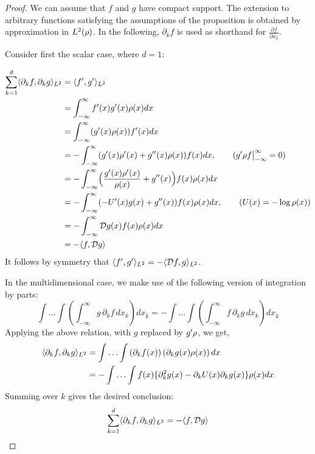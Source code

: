 \begin{proof}[Proof]
	We can assume that $f$ and $g$ have compact support. The extension to arbitrary functions satisfying the assumptions of the proposition is obtained by approximation in $L^2(\rho)$. In the following, $\partial_k f$ is used as shorthand for $\frac{\partial f}{\partial x_k}$. 
	
	Consider first the scalar case, where $d=1$: 

	\begin{equation}
	\begin{aligned}
	\sum_{k=1}^d \langle \partial_k f,  \partial_k g\rangle_{L^2}&= \langle f', g' \rangle_{L^2}\\
	&= \int_{-\infty}^{\infty} f'(x)g'(x)\rho(x)dx \\
	&= \int_{-\infty}^{\infty} (g'(x) \rho(x)) f'(x)dx \\
	&= -\int_{-\infty}^{\infty}(g'(x) \rho'(x) +g''(x) \rho(x)) f(x) dx, \qquad{ (g'\rho f \big|_{-\infty}^{\infty}=0) }\\
	&= -\int_{-\infty}^{\infty}\Bigl(\frac{g'(x) \rho'(x)}{\rho(x)}+g''(x)\Bigr) f(x) \rho(x) dx \\
	&= -\int_{-\infty}^{\infty}(-U'(x) g(x) + g''(x))  f(x) \rho(x) dx, \qquad ( U(x) = -\log \rho(x) )\\
	&= -\int_{-\infty}^{\infty} {\cal D} g (x) f(x) \rho(x) dx \\
	&= -\langle f, {\cal D} g \rangle
	\end{aligned}
	\end{equation}
	It follows by symmetry that $\langle f', g' \rangle_{L^2} = - \langle {\cal D} f, g \rangle_{L^2}$.  
	
	In the multidimensional case, we make use of the following version of integration by parts:
	\begin{equation}
	\int \hdots \int \left(\int_{-\infty}^{\infty} g \, \partial_k f \, dx_k\right) dx_{\bar{k}} = -\int \hdots \int \left(\int_{-\infty}^{\infty} f\, \partial_k g \, dx_k\right) dx_{\bar{k}}
	\end{equation}
	Applying the above relation, with $g$ replaced by $g'\rho$, we get, 
	\begin{equation}
	\begin{aligned}
	\langle \partial_k f, \partial_k g \rangle_{L^2} &= \int \hdots \int \left(\partial_k f(x)\right)\left(\partial_k g(x)\rho(x)\right)dx\\
	&= -\int \hdots \int f(x)\{\partial_k^2 g(x)-\partial_k U(x)\partial_k g(x)\}\rho(x)dx\\
	\end{aligned}
	\end{equation}
	Summing over $k$ gives the desired conclusion:
	\begin{equation}
	\sum_{k=1}^{d} \langle\partial_k f, \partial_k g\rangle_{L^2}= -\langle f, {\cal D} g\rangle
	\end{equation}
\end{proof}

